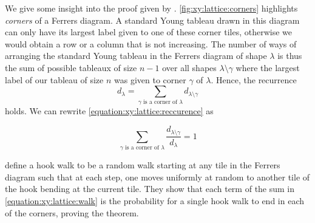 We give some insight into the proof given by \citet*{greene:1979}.
\ref{fig:xy:lattice:corners} highlights \emph{corners} of a Ferrers diagram. A
standard Young
tableau drawn in this diagram can only have its largest label given to
one of these corner tiles, otherwise we would obtain a row or a column that is
not increasing. The number of ways of arranging the standard Young tableau in the
Ferrers diagram of shape \(\lambda\) is thus the sum of possible tableaux of
size \(n-1\) over all shapes \(\lambda \setminus \gamma\) where the largest
label of our tableau of size \(n\) was given to corner \(\gamma\) of
\(\lambda\). Hence, the recurrence
\begin{equation}\label{equation:xy:lattice:reccurence}
d_{\lambda} = \sum_{\gamma \text{ is a corner of } \lambda} d_{\lambda
\setminus \gamma}
\end{equation}
holds. We can rewrite \ref{equation:xy:lattice:reccurence} as

\begin{equation}\label{equation:xy:lattice:walk}
\sum_{\gamma \text{ is a corner of } \lambda} \frac{d_{\lambda
\setminus \gamma}}{d_{\lambda}} = 1
\end{equation}

\citet*{greene:1979} define a hook walk to be a random walk starting at
any tile in the Ferrers diagram such that at each step, one moves uniformly at
random to another tile of the hook bending at the current tile.
They show that each term of the sum in \ref{equation:xy:lattice:walk} is
the probability for a single hook walk to end in each of the corners, proving
the theorem.

